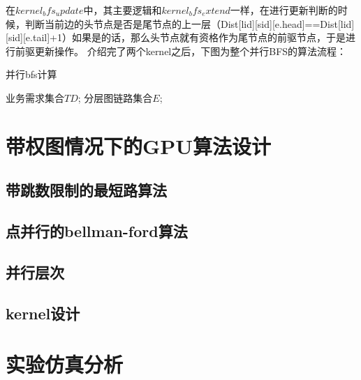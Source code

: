  在$kernel_bfs_update$中，其主要逻辑和$kernel_bfs_extend$一样，在进行更新判断的时候，判断当前边的头节点是否是尾节点的上一层（Dist[lid][sid][e.head]==Dist[lid][sid][e.tail]+1）如果是的话，那么头节点就有资格作为尾节点的前驱节点，于是进行前驱更新操作。
  介绍完了两个kernel之后，下图为整个并行BFS的算法流程：
\begin{algorithm}[t]
\begin{algorithmic}[1]
\caption{{并行bfs计算}}
\label{ParaSPC}
\Require
	 业务需求集合$TD$;
      分层图链路集合$E$;
\EndFor
\EndFor
\EndFor
{}
\EndFor
{}
\EndWhile
{}
\EndFor
{}
\end{algorithmic}
\end{algorithm}
\section{带权图情况下的GPU算法设计}
  
\subsection{带跳数限制的最短路算法}
\subsection{点并行的bellman-ford算法}
\subsection{并行层次}
\subsection{kernel设计}
\section{实验仿真分析}